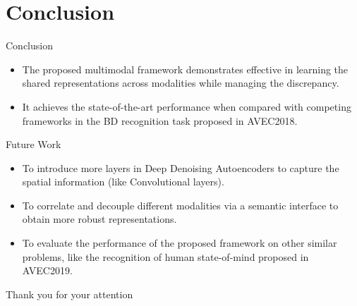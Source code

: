 \documentclass{beamer}
\begin{document}
\section{Conclusion}

\begin{frame}{Conclusion}

\begin{itemize}
    \item The proposed multimodal framework demonstrates effective in learning the shared representations across modalities while managing the discrepancy.
    \item It achieves the state-of-the-art performance when compared with competing frameworks in the BD recognition task proposed in AVEC2018.
\end{itemize}

\end{frame}

\begin{frame}{Future Work}

\begin{itemize}
    \item To introduce more layers in Deep Denoising Autoencoders to capture the spatial information (like Convolutional layers).
    \item To correlate and decouple different modalities via a semantic interface to obtain more robust representations.
    \item To evaluate the performance of the proposed framework on other similar problems, like the recognition of human state-of-mind proposed in AVEC2019.
\end{itemize}
    
\end{frame}


\begin{frame}
\printbibliography
\end{frame}

\begin{frame}{}
\centering
Thank you for your attention
\end{frame}
\end{document}
